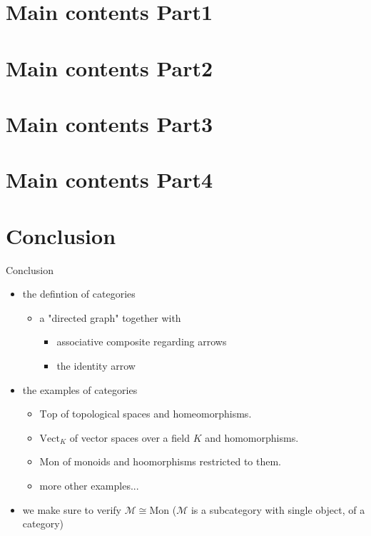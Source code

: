 \documentclass[dvipdfmx,10pt,notheorems]{beamer}
\renewcommand{\#}{^\sharp}
\begin{document}
\section{Main contents Part1}






\section{Main contents Part2}







\section{Main contents Part3}






\section{Main contents Part4}






\section{Conclusion}
	\begin{frame}{Conclusion}
		\begin{itemize}
 			\item the defintion of categories
					\begin{itemize}
							\item a "directed graph" together with
									\begin{itemize}
											\item associative composite regarding arrows
											\item the identity arrow
									\end{itemize}
					\end{itemize}
			\item the examples of categories
					\begin{itemize}
							\item $\mathrm{Top}$ of topological spaces and homeomorphisms.
							\item $\mathrm{Vect}_K$ of vector spaces over a field $K$ and homomorphisms.
							\item $\mathrm{Mon}$ of monoids and hoomorphisms restricted to them.
							\item more other examples...
					\end{itemize}
			\item we make sure to verify
			$\mathcal{M}\cong\mathrm{Mon}$ ($\mathcal{M}$ is a subcategory with single object,
			of a category)
		\end{itemize}
	\end{frame}
\end{document}
